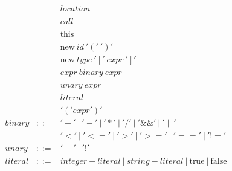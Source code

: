 \documentclass{article}
\begin{document}
$$\begin{array}{rcl}
 & | & location\\
 & | & call\\
 & | & \textrm{this} \\
 & | & \textrm{new} ~id ~'('~')' \\
 & | & \textrm{new} ~type ~'['~expr~']' \\
 & | & expr ~binary ~expr\\
 & | & unary ~expr\\
 & | & literal\\
 & | & '('expr')'\\
 binary & ::= & '+' ~|~ '-' ~|~ '*' ~|~ '/' ~|~ '\&\&' ~|~ '\|' \\
 & | &  '<' ~|~ '<=' ~|~ '>' ~|~ '>=' ~|~ '==' ~|~ '!=' \\
 unary & ::= & '-' ~|~ '!' \\
 literal & ::= & integer-literal ~|~ string-literal ~|~ \textrm{true} ~|~ \textrm{false} \\
\end{array}
$$



{\footnotesize 

}

\end{document}
